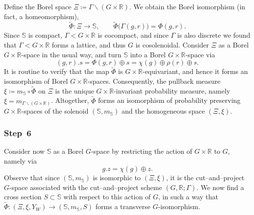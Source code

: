 \documentclass{amsart}
\numberwithin{equation}{subsection}
\theoremstyle{remark}
\begin{document}
Define the Borel space \(\Xi\coloneqq\Gamma\backslash\left(G\times\mathbb{R}\right)\). We obtain the Borel isomorphism (in fact, a homeomorphism),
\[\widetilde{\Phi}:\Xi\longrightarrow \mathbb{S},\qquad \widetilde{\Phi}\big(\Gamma(g,r)\big)=\Phi(g,r).\]
Since \(\mathbb{S}\) is compact, \(\Gamma<G\times\mathbb{R}\) is cocompact, and since \(\Gamma\) is also discrete we found that \(\Gamma<G\times\mathbb{R}\) forms a lattice, and thus \(G\) is cosolenoidal. Consider \(\Xi\) as a Borel \(G\times\mathbb{R}\)-space in the usual way, and turn \(\mathbb{S}\) into a Borel \(G\times\mathbb{R}\)-space via
\[\left(g,r\right).s=\Phi\left(g,r\right)\oplus s=\chi\left(g\right)\oplus\rho\left(r\right)\oplus s.\]
It is routine to verify that the map \(\widetilde{\Phi}\) is \(G\times\mathbb{R}\)-equivariant, and hence it forms an isomorphism of Borel \(G\times\mathbb{R}\)-spaces. Consequently, the pullback measure \(\xi\coloneqq m_{\mathbb{S}}\circ\widetilde{\Phi}\) on \(\Xi\) is the unique \(G\times\mathbb{R}\)-invariant probability measure, namely \(\xi=m_{\Gamma\backslash\left(G\times\mathbb{R}\right)}\). Altogether, \(\widetilde{\Phi}\) forms an isomorphism of probability preserving \(G\times\mathbb{R}\)-spaces of the solenoid \(\left(\mathbb{S},m_{\mathbb{S}}\right)\) and the homogeneous space \(\left(\Xi,\xi\right)\).

\subsubsection*{\textbf{Step~6}}

Consider now \(\mathbb{S}\) as a Borel \(G\)-space by restricting the action of \(G\times\mathbb{R}\) to \(G\), namely via
\[g.z=\chi\left(g\right)\oplus z.\]
Observe that since \(\left(\mathbb{S},m_{\mathbb{S}}\right)
\) is isomorphic to \(\left(\Xi,\xi\right)\), it is the cut--and--project \(G\)-space associated with the cut--and--project scheme \(\left(G,\mathbb{R};\Gamma\right)\). We now find a cross section \(S\subset\mathbb{S}\) with respect to this action of \(G\), in such a way that  \(\widetilde{\Phi}:\left(\Xi,\xi,Y_{W}\right)\to\left(\mathbb{S},m_{\mathbb{S}},S\right)\) forms a transverse \(G\)-isomorphism.

\smallskip
\end{document}

